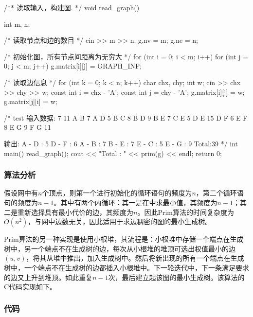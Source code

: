 \begin{Codex}[label=am_graph_prim1.cpp]
/** 读取输入，构建图. */
void read_graph() {
    int m, n;

    /* 读取节点和边的数目 */
    cin >> m >> n;
    g.nv = m;
    g.ne = n;

    /* 初始化图，所有节点间距离为无穷大 */
    for (int i = 0; i < m; i++) {
        for (int j = 0; j < m; j++) {
            g.matrix[i][j] = GRAPH_INF;
        }
    }

    /* 读取边信息 */
    for (int k = 0; k < n; k++) {
        char chx, chy;
        int w;
        cin >> chx >> chy >> w;
        const int i = chx - 'A';
        const int j = chy - 'A';
        g.matrix[i][j] = w;
        g.matrix[j][i] = w;
    }
}

/* test
输入数据:
7 11
A B 7
A D 5
B C 8
B D 9
B E 7
C E 5
D E 15
D F 6
E F 8
E G 9
F G 11

输出:
A - D : 5
D - F : 6
A - B : 7
B - E : 7
E - C : 5
E - G : 9
Total:39
*/
int main() {
    read_graph();
    cout << "Total : " << prim(g) << endl;
    return 0;
}
\end{Codex}


\subsubsection{算法分析}
假设网中有$n$个顶点，则第一个进行初始化的循环语句的频度为$n$，第二个循环语句的频度为$n-1$。其中有两个内循环：其一是在中求最小值，其频度为$n-1$；其二是重新选择具有最小代价的边，其频度为$n$。因此Prim算法的时间复杂度为$O(n^2)$，与网中边数无关，因此适用于求边稠密的图的最小生成树。

Prim算法的另一种实现是使用小根堆，其流程是：小根堆中存储一个端点在生成树中，另一个端点不在生成树的边，每次从小根堆的堆顶可选出权值最小的边$(u, v)$，将其从堆中推出，加入生成树中。然后将新出现的所有一个端点在生成树中，一个端点不在生成树的边都插入小根堆中。下一轮迭代中，下一条满足要求的边又上升到堆顶。如此重复$n-1$次，最后建立起该图的最小生成树。该算法的C代码实现如下。


\subsubsection{代码}

